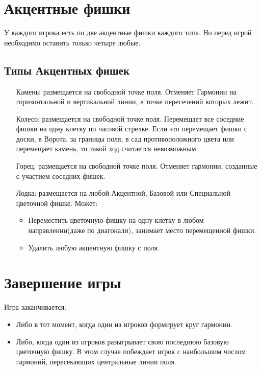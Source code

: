 \documentclass[a4paper,12pt]{diplom}
\begin{document}
\section{Акцентные фишки}

У каждого игрока есть по две акцентные фишки каждого типа. Но перед игрой необходимо оставить только четыре любые.

\subsection{Типы Акцентных фишек}

\begin{enumerate}
	\item[Камень:] размещается на свободной точке поля. Отменяет Гармонии на горизонтальной и вертикальной линии, в точке пересечений которых лежит. 
	\item[Колесо:] размещается на свободной точке поля. Перемещает все соседние фишки на одну клетку по часовой стрелке. Если это перемещает фишки с доски, в Ворота, за границы поля, в сад противоположного цвета или перемещает камень, то такой ход считается невозможным.
	\item[Горец:] размещается на свободной точке поля. Отменяет гармонии, созданные с участием соседних фишек.
	\item[Лодка:] размещается на любой Акцентной, Базовой или Специальной цветочной фишке. Может:
	\begin{itemize}
		\item Переместить цветочную фишку на одну клетку в любом направлении(даже по диагонали), занимает место перемещенной фишки.
		\item Удалить любую акцентную фишку с поля.
	\end{itemize}
\end{enumerate}

\section{Завершение игры}

Игра заканчивается:
\begin{itemize}
	\item Либо в тот момент, когда один из игроков формирует круг гармонии.
	\item Либо, когда один из игроков разыгрывает свою последнюю базовую цветочную фишку. В этом случае побеждает игрок с наибольшим числом гармоний, пересекающих центральные линии поля.
\end{itemize}
\end{document}
